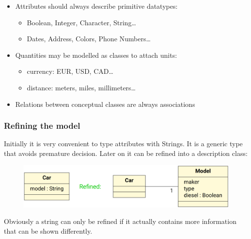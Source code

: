 \documentclass[
../../Software_Engineering_Summary.tex,
]
{subfiles}
\begin{document}
\begin{defbox}
    \begin{itemize}
        \item Attributes should always describe primitive datatypes:
        \begin{itemize}
            \item Boolean, Integer, Character, String\dots
            \item Dates, Address, Colors, Phone Numbers\dots
        \end{itemize}
        \item Quantities may be modelled as classes to attach units:
        \begin{itemize}
            \item currency: EUR, USD, CAD\dots
            \item distance: meters, miles, millimeters\dots
        \end{itemize}
        \item Relations between conceptual classes are always associations
    \end{itemize}
\end{defbox}

\newpage
\subsubsection{Refining the model}
Initially it is very convenient to type attributes with Strings. It is a generic type that avoids premature decision. Later on it can be refined into a description class:
\begin{figure}[htp]
    \centering
    \includegraphics[scale=0.5]{Pics/04/RefiningModelTypes.png}
\end{figure}

Obviously a string can only be refined if it actually contains more information that can be shown differently. 
\end{document}
